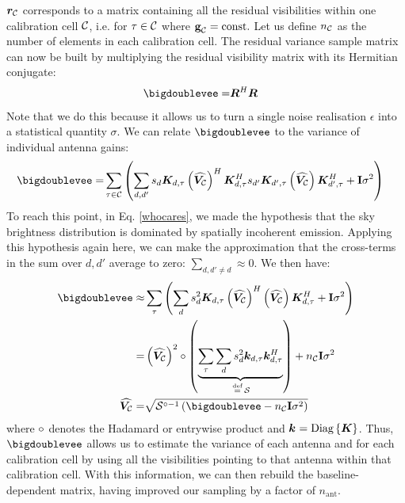 \pg
$\bm{r}_{\mathcal{C}}$ corresponds to a matrix containing all the residual visibilities within one calibration cell $\mathcal{C}$, i.e. for $\tau \in \mathcal{C}$ where $\textbf{g}_{\mathcal{C}} = \mathrm{const.}$ Let us define $n_{\mathcal{C}}$ as the number of elements in each calibration cell. The residual variance sample matrix can now be built by multiplying the residual visibility matrix with its Hermitian conjugate:
\begin{align}
\matVV             =& \bm{R}^H \bm{R} \label{eq.matvv.definition} %
\end{align}
Note that we do this because it allows us to turn a single noise realisation $\epsilon$ into a statistical quantity $\sigma$.
We can relate $\matVV$ to the variance of individual antenna gains:
\begin{align}
\matVV
            =& \sum_{\tnuIndeix\in\cellindex} \left(\sum_{d,d'} s_d \Kmat{d,\tnuIndeix} \left( \VarmatC \right)^H \Kmat{d,\tnuIndeix}^H s_{d'} \Kmat{d',\tnuIndeix} \left( \VarmatC \right) \Kmat{d',\tnuIndeix}^H + \I\sigma^2 \right)
\end{align}
To reach this point, in Eq. \ref{whocares}, we made the hypothesis that the sky brightness distribution is dominated by spatially incoherent emission. Applying this hypothesis again here, we can make the approximation that the cross-terms in the sum over $d,d'$ average to zero: $\sum_{d,d'\ne d}\approx 0$. We then have:
\begin{align}
\matVV\approx& \sum_\tnuIndeix \left(\sum_d s_d^2 \Kmat{d,\tnuIndeix} \left( \VarmatC \right)^H  \left( \VarmatC \right) \Kmat{d,\tnuIndeix}^H + \I\sigma^2\right)\\
            =& \left(\VarmatC\right)^2\hadam \left(\underbrace{\sum_{\tnuIndeix}\sum_d s_d^2 \kvect{d,\tnuIndeix}\kvect{d,\tnuIndeix}^H}_{\bydefn \mathcal{S}}\right) + n_\cellindex\I\sigma^2\\
\VarmatC    =& \sqrt{\mathcal{S}^{\hadam-1}\left(\matVV-n_\cellindex\I\sigma^2\right)}
\end{align}
where $\circ$ denotes the Hadamard or entrywise product and $\bm{k}_{}=\text{Diag}\left\{\bm{K}_{}\right\}$. %
Thus, $\matVV$ allows us to estimate the variance of each antenna and for each calibration cell by using all the visibilities pointing to that antenna within that calibration cell. With this information, we can then rebuild the baseline-dependent matrix, having improved our sampling by a factor of $n_{\mathrm{ant}}$.


